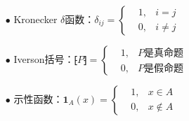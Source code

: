 \documentclass[main.tex]{subfiles}
\begin{document}
\begin{itemize}
    \item[\(\bullet\)] Kronecker \(\delta\)函数：\(\delta_{ij}=\left\{\begin{aligned} & 1, & i=j \\ & 0, &i \neq j \end{aligned}\right.\)
    \item[\(\bullet\)] Iverson括号：\(⁅P⁆ = \left\{\begin{aligned} & 1, & P\mbox{是真命题} \\ & 0, &P\mbox{是假命题} \end{aligned}\right.\) 
    \item[\(\bullet\)] 示性函数：\(\bm{1}_A(x) = \left\{\begin{aligned} & 1, & x \in A \\ & 0, &x \not \in A \end{aligned}\right.\) 
\end{itemize}
\end{document}
